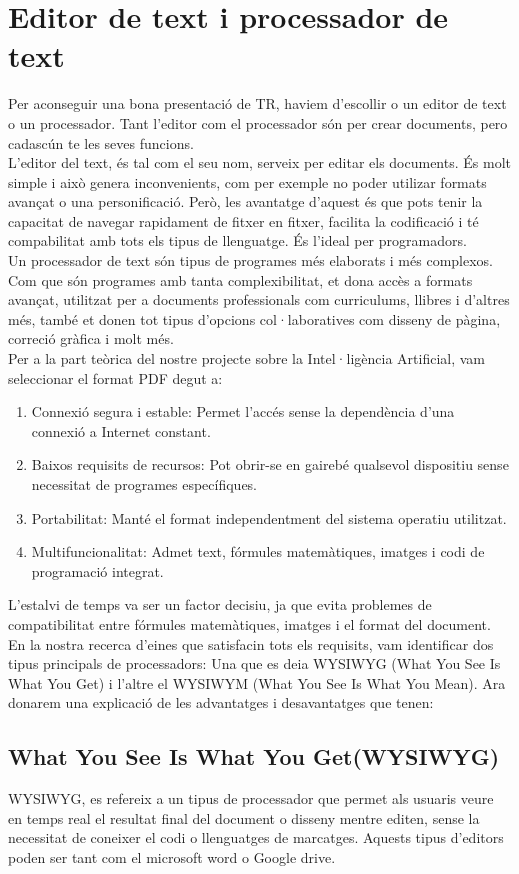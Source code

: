 \section{Editor de text i processador de text}\label{sec:4.2}
Per aconseguir una bona presentació de TR, haviem d'escollir o un editor de text o un processador. Tant l'editor com el processador són per crear documents, pero cadascún te les seves funcions.\\
L'editor del text, és tal com el seu nom, serveix per editar els documents. És molt simple i això genera inconvenients, com per exemple no poder utilizar formats avançat o una personificació. Però, les avantatge d'aquest és que pots tenir la capacitat de navegar rapidament de fitxer en fitxer, facilita la codificació i té compabilitat amb tots els tipus de llenguatge. És l'ideal per programadors.\\
Un processador de text són tipus de programes més elaborats i més complexos. Com que són programes amb tanta complexibilitat, et dona accès a formats avançat, utilitzat per a documents professionals com curriculums, llibres i d'altres més, també et donen tot tipus d'opcions col·laboratives com disseny de pàgina, correció gràfica i molt més.\\
Per a la part teòrica del nostre projecte sobre la Intel·ligència Artificial, vam seleccionar el format PDF degut a:
\begin{enumerate}
 \item Connexió segura i estable: Permet l'accés sense la dependència d'una connexió a Internet constant.
 \item Baixos requisits de recursos: Pot obrir-se en gairebé qualsevol dispositiu sense necessitat de programes específiques.
 \item Portabilitat: Manté el format independentment del sistema operatiu utilitzat.
 \item Multifuncionalitat: Admet text, fórmules matemàtiques, imatges i codi de programació integrat.
\end{enumerate}
L'estalvi de temps va ser un factor decisiu, ja que evita problemes de compatibilitat entre fórmules matemàtiques, imatges i el format del document.
En la nostra recerca d'eines que satisfacin tots els requisits, vam identificar dos tipus principals de processadors: Una que es deia WYSIWYG (What You See Is What You Get) i l'altre el WYSIWYM (What You See Is What You Mean). Ara donarem una explicació de les advantatges i desavantatges que tenen:
\subsection{What You See Is What You Get(WYSIWYG)}
WYSIWYG, es refereix a un tipus de processador que permet als usuaris veure en temps real el resultat final del document o disseny mentre editen, sense la necessitat de coneixer el codi o llenguatges de marcatges. Aquests tipus d'editors poden ser tant com el microsoft word o Google drive.

